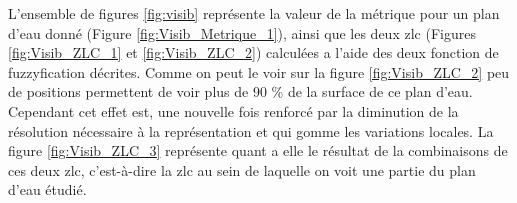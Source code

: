 L'ensemble de figures \ref{fig:visib} représente la valeur de la
métrique  pour un plan d'eau donné (Figure
\ref{fig:Visib_Metrique_1}), ainsi que les deux \ac{zlc} (Figures
\ref{fig:Visib_ZLC_1} et \ref{fig:Visib_ZLC_2}) calculées a l'aide des
deux fonction de fuzzyfication décrites. Comme on peut le voir sur la
figure \ref{fig:Visib_ZLC_2} peu de positions permettent de voir plus
de 90 \% de la surface de ce plan d'eau. Cependant cet effet est, une
nouvelle fois renforcé par la diminution de la résolution nécessaire à
la représentation et qui gomme les variations locales. La figure
\ref{fig:Visib_ZLC_3} représente quant a elle le résultat de la
combinaisons de ces deux \ac{zlc}, c'est-à-dire la \ac{zlc} au sein de
laquelle on voit une partie du plan d'eau étudié.

\begin{figure}
  \centering
  \hspace{1cm}
  \subfloat[\label{fig:Visib_ZLC_1}]{%
}
\end{figure}
